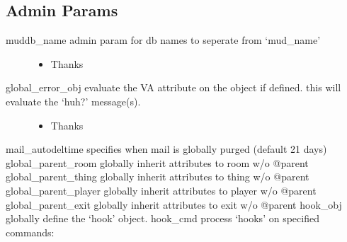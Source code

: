 \documentclass[letterpaper,10pt,english]{sphinxmanual}
\begin{document}
\subsection{Admin Params}
\label{\detokenize{changelog:id24}}\begin{description}
\item[{muddb\_name \sphinxhyphen{} admin param for db names to seperate from ‘mud\_name’}] \leavevmode\begin{itemize}
\item {} 
\sphinxAtStartPar
Thanks 

\end{itemize}

\item[{global\_error\_obj \sphinxhyphen{} evaluate the VA attribute on the object if defined.  this will evaluate the ‘huh?’ message(s).}] \leavevmode\begin{itemize}
\item {} 
\sphinxAtStartPar
Thanks 

\end{itemize}

\end{description}

\sphinxAtStartPar
mail\_autodeltime \sphinxhyphen{} specifies when mail is globally purged (default 21 days)
global\_parent\_room \sphinxhyphen{} globally inherit attributes to room w/o @parent
global\_parent\_thing \sphinxhyphen{} globally inherit attributes to thing w/o @parent
global\_parent\_player \sphinxhyphen{} globally inherit attributes to player w/o @parent
global\_parent\_exit \sphinxhyphen{} globally inherit attributes to exit w/o @parent
hook\_obj \sphinxhyphen{} globally define the ‘hook’ object.
hook\_cmd \sphinxhyphen{} process ‘hooks’ on specified commands:

\begin{sphinxVerbatim}[commandchars=\\\{\}]
                   
                   
                     
                      
                

    
\end{sphinxVerbatim}
\end{document}
